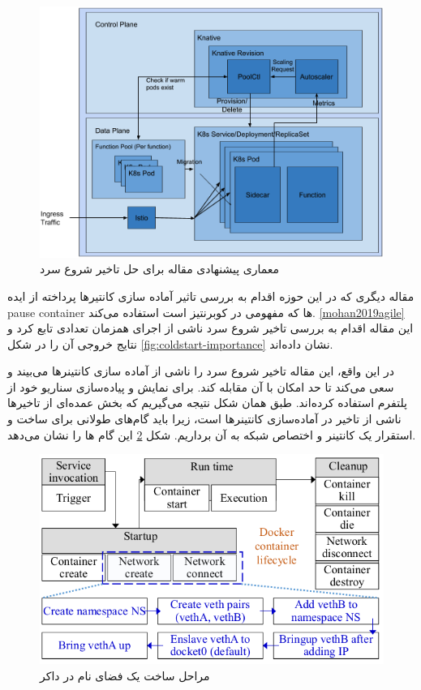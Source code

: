 \begin{figure}
	\centering
	\includegraphics[width=\linewidth]{figs/Knative-architecture-modified}
	\caption {معماری پیشنهادی مقاله برای حل تاخیر شروع سرد}
	\label{fig:Knative-architecture-modified}
\end{figure}

\par
\par
مقاله دیگری که در این حوزه اقدام به بررسی تاثیر آماده سازی کانتیرها پرداخته از ایده pause container ها که مفهومی در کوبرنتیز است استفاده می‌کند. \ref{mohan2019agile}
این مقاله اقدام به بررسی تاخیر شروع سرد ناشی از اجرای همزمان تعدادی تابع کرد و نتایج خروجی آن را در شکل \ref{fig:coldstart-importance} نشان داده‌اند. 

در این واقع، این مقاله تاخیر شروع سرد را ناشی از آماده سازی کانتینر‌ها می‌بیند و سعی می‌کند تا حد امکان با آن مقابله کند. برای نمایش و پیاده‌سازی سناریو خود از پلتفرم‌  استفاده کرده‌اند. طبق همان شکل نتیجه می‌گیریم که بخش عمده‌ای از تاخیرها ناشی از تاخیر در آماده‌سازی کانتینرها است، زیرا باید گام‌های طولانی برای ساخت و استقرار یک کانتینر و اختصاص شبکه به آن برداریم. شکل \ref{fig:container-network-creation} این گام ها را نشان می‌دهد.

\begin{figure}
	\centering
	\includegraphics[width=\linewidth]{figs/container-network-creation}
	\caption {مراحل ساخت یک فضای نام در داکر}
	\label{fig:container-network-creation}
\end{figure}

